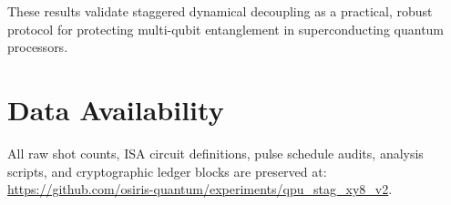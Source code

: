 \documentclass[twocolumn,aps,pra,superscriptaddress,showpacs,floatfix]{revtex4-2}
\begin{document}
These results validate staggered dynamical decoupling as a practical, robust protocol for protecting multi-qubit entanglement in superconducting quantum processors.

\section*{Data Availability}
All raw shot counts, ISA circuit definitions, pulse schedule audits, analysis scripts, and cryptographic ledger blocks are preserved at: \url{https://github.com/osiris-quantum/experiments/qpu_stag_xy8_v2}.
\end{document}
